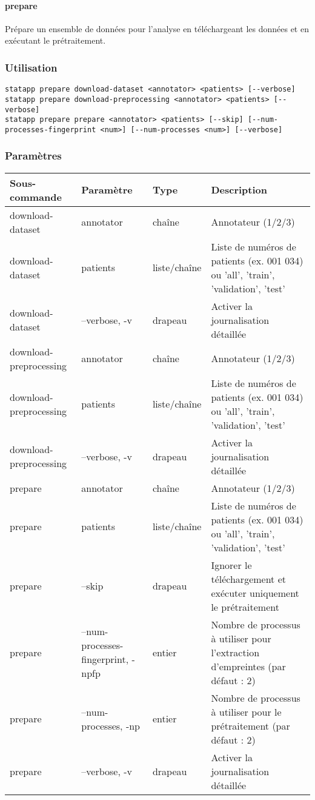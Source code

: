 \documentclass{article}
\begin{document}
\paragraph{prepare}
Prépare un ensemble de données pour l'analyse en téléchargeant les données et en exécutant le prétraitement.

\subsubsection{Utilisation}
\begin{lstlisting}
statapp prepare download-dataset <annotator> <patients> [--verbose]
statapp prepare download-preprocessing <annotator> <patients> [--verbose]
statapp prepare prepare <annotator> <patients> [--skip] [--num-processes-fingerprint <num>] [--num-processes <num>] [--verbose]
\end{lstlisting}

\subsubsection{Paramètres}
\begin{tabulary}{\linewidth}{LLLL}
\toprule
\textbf{Sous-commande} & \textbf{Paramètre} & \textbf{Type} & \textbf{Description} \\
\midrule
download-dataset & annotator & chaîne & Annotateur (1/2/3) \\
download-dataset & patients & liste/chaîne & Liste de numéros de patients (ex. 001 034) ou 'all', 'train', 'validation', 'test' \\
download-dataset & --verbose, -v & drapeau & Activer la journalisation détaillée \\
\midrule
download-preprocessing & annotator & chaîne & Annotateur (1/2/3) \\
download-preprocessing & patients & liste/chaîne & Liste de numéros de patients (ex. 001 034) ou 'all', 'train', 'validation', 'test' \\
download-preprocessing & --verbose, -v & drapeau & Activer la journalisation détaillée \\
\midrule
prepare & annotator & chaîne & Annotateur (1/2/3) \\
prepare & patients & liste/chaîne & Liste de numéros de patients (ex. 001 034) ou 'all', 'train', 'validation', 'test' \\
prepare & --skip & drapeau & Ignorer le téléchargement et exécuter uniquement le prétraitement \\
prepare & --num-processes-fingerprint, -npfp & entier & Nombre de processus à utiliser pour l'extraction d'empreintes (par défaut : 2) \\
prepare & --num-processes, -np & entier & Nombre de processus à utiliser pour le prétraitement (par défaut : 2) \\
prepare & --verbose, -v & drapeau & Activer la journalisation détaillée \\
\bottomrule
\end{tabulary}
\end{document}

